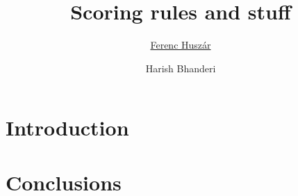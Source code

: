 \documentclass[11pt]{CUEDthesisPSnPDF}
\title{Scoring rules and stuff}
\author{\href{mailto:ferenc.huszar@gmail.com}{Ferenc Husz\'{a}r}}
\author{Harish Bhanderi}
\begin{document}
\maketitle

\setcounter{secnumdepth}{3}
\setcounter{tocdepth}{3}

\frontmatter
{}




\tableofcontents
\listoffigures
\mainmatter

\ChapterOutsidePart

\chapter{Introduction}



\ChapterInsidePart







\ChapterOutsidePart

\chapter{Conclusions}




\renewcommand{\bibname}{References}

\end{document}
